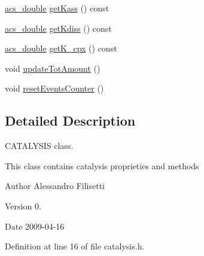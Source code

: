 \begin{DoxyCompactItemize}
\item 
\hyperlink{acs__headers_8h_ab776853a005fcbf56af0424a2a4dd607}{acs\-\_\-double} \hyperlink{classcatalysis_a471d98737d6708b3ac03efba41082d0c}{get\-Kass} () const 
\item 
\hyperlink{acs__headers_8h_ab776853a005fcbf56af0424a2a4dd607}{acs\-\_\-double} \hyperlink{classcatalysis_ad8b0d5f6410e2256cfefe0db9a10b0af}{get\-Kdiss} () const 
\item 
\hyperlink{acs__headers_8h_ab776853a005fcbf56af0424a2a4dd607}{acs\-\_\-double} \hyperlink{classcatalysis_a182bfb05b12ddd3613693f6d1f362665}{get\-K\-\_\-cpx} () const 
\item 
void \hyperlink{classcatalysis_a9c90e6f2cd9aafd2029ef20a09b95eb2}{update\-Tot\-Amount} ()
\item 
void \hyperlink{classcatalysis_ab8964f8ec17d677de03747520d0a9995}{reset\-Events\-Counter} ()
\end{DoxyCompactItemize}


\subsection{Detailed Description}
C\-A\-T\-A\-L\-Y\-S\-I\-S class. 

This class contains catalysis proprieties and methods \begin{DoxyAuthor}{Author}
Alessandro Filisetti 
\end{DoxyAuthor}
\begin{DoxyVersion}{Version}
0. 
\end{DoxyVersion}
\begin{DoxyDate}{Date}
2009-\/04-\/16 
\end{DoxyDate}


Definition at line 16 of file catalysis.\-h.



